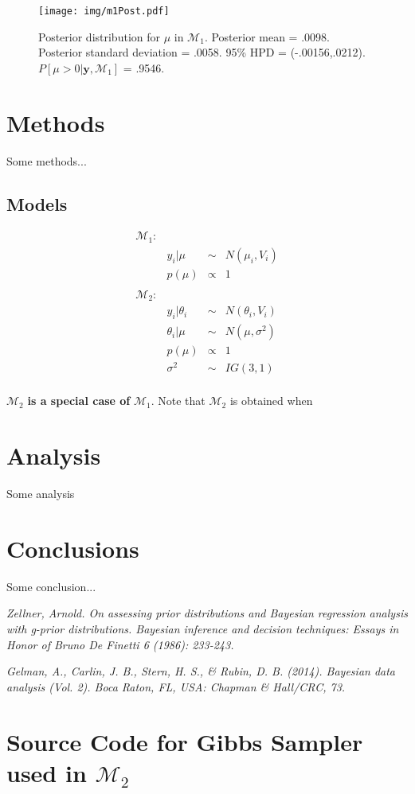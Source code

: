 \documentclass{../../tex_template/asaproc}
\newcommand{\bk}[1]{\left[#1\right]}
\newcommand{\M}{\mathcal{M}}
\begin{document}
\begin{figure}[H]
  \texttt{[image: img/m1Post.pdf]}
  \caption{\small Posterior distribution for $\mu$ in $\M_1$.
  Posterior mean = .0098. Posterior standard deviation = .0058.
  95\% HPD = (-.00156,.0212). $P\bk{\mu>0|\bm{y},\M_1}$ = .9546.}
  \label{fig:m1Post}
\end{figure}



\section{Methods}
Some methods...

\subsection{Models}

$$
\begin{array}{lrcl}
  \M_1: \\
  & y_i | \mu &\sim& N(\mu_i,V_i)\\
  & p(\mu) &\propto& 1\\
  \\
  \M_2: \\
  & y_i | \theta_i &\sim& N(\theta_i,V_i)\\
  & \theta_i | \mu &\sim& N(\mu,\sigma^2)\\
  & p(\mu) &\propto& 1\\
  & \sigma^2 &\sim& IG(3,1)\\
\end{array}
$$

$\M_2$ \textbf{is a special case of} $\M_1$. Note that $\M_2$ is
obtained when 

\section{Analysis}
Some analysis

\section{Conclusions}
Some conclusion...

\begin{references}
{\footnotesize
\itemsep=3pt
\item {\em Zellner, Arnold. On assessing prior distributions and Bayesian regression analysis with g-prior distributions. Bayesian inference and decision techniques: Essays in Honor of Bruno De Finetti 6 (1986): 233-243.}
\item {\em Gelman, A., Carlin, J. B., Stern, H. S., \& Rubin, D. B. (2014). Bayesian data analysis (Vol. 2). Boca Raton, FL, USA: Chapman \& Hall/CRC, 73.}
}
\end{references}

\newpage
\section{Source Code for Gibbs Sampler used in $\M_2$}

\end{document}
